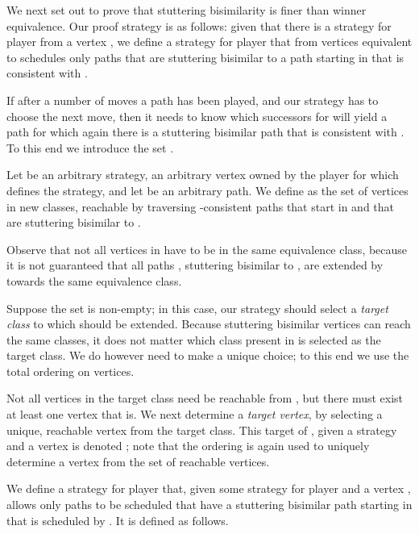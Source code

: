 \documentclass[a4paper]{llncs}
\newcommand{\pathprefix}[3]{\ensuremath{#1_{#2}^{#3}}}
\begin{document}
\medskip

We next set out to prove that stuttering bisimilarity is finer than
winner equivalence. Our proof strategy is as follows: given that there is
a strategy  for player  from a vertex , we define a 
strategy for player  that from vertices equivalent to  schedules 
only paths that are stuttering bisimilar to a path starting in  that is 
consistent with .

If after a number of moves a path  has been played, and our strategy
has to choose the next move, then it needs to know which successors for  
will yield a path for which again there is a stuttering bisimilar path that
is consistent with . To this end we introduce the set .

Let  be an arbitrary strategy,  an arbitrary vertex owned by the 
player for which  defines the strategy, and let  be an arbitrary 
path. We define  as the set of vertices in new classes, 
reachable by traversing -consistent paths that start in  and that 
are stuttering bisimilar to .

Observe that not all vertices in  have to be in the same
equivalence class, because it is not guaranteed that all paths , stuttering bisimilar to , are extended by  
towards the same equivalence class.

Suppose the set  is non-empty; in this case, our strategy
should select a \emph{target class} to which  should be extended. Because
stuttering bisimilar vertices can reach the same classes, it does not matter
which class present in  is selected as the target class.
We do however need to make a unique choice; to this end we use the total
ordering  on vertices.

Not all vertices in the target class need be reachable from , but there
must exist at least one vertex that is.
We next determine a \emph{target vertex}, by selecting a unique, reachable
vertex from the target class. This
target of , given a strategy  and a vertex  is denoted ; note that
the ordering  is again used to uniquely determine a vertex from the set
of reachable vertices.

\begin{definition}
We define a strategy  for player  that, given some strategy  for player  and a vertex , 
allows only paths to be scheduled that have a stuttering bisimilar
path starting in  that is scheduled by . It is defined as follows.
  
\end{definition}

\renewcommand{\pathprefix}[3]{\vec{#1}}
\newcommand{\slice}[3]{\pathprefix{#1}{}{}_{#2} \ldots \pathprefix{#1}{}{}_{#3}}
\end{document}
